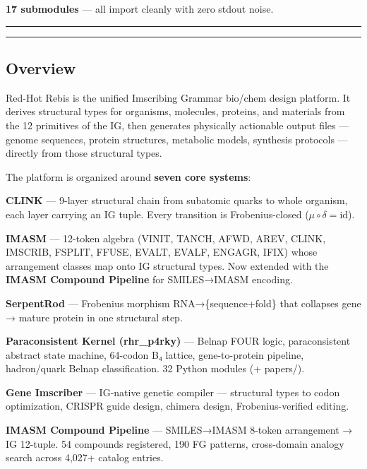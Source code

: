 \documentclass[12pt,a4paper]{article}
\begin{document}
\textbf{17 submodules} --- all import cleanly with zero stdout noise.

\begin{center}\rule{0.5\linewidth}{0.5pt}\end{center}

\begin{center}\rule{0.5\linewidth}{0.5pt}\end{center}

\hypertarget{overview}{%
\subsection{Overview}\label{overview}}

Red-Hot Rebis is the unified Imscribing Grammar bio/chem design
platform. It derives structural types for organisms, molecules,
proteins, and materials from the 12 primitives of the IG, then generates
physically actionable output files --- genome sequences, protein
structures, metabolic models, synthesis protocols --- directly from
those structural types.

The platform is organized around \textbf{seven core systems}:

\textbf{CLINK} --- 9-layer structural chain from subatomic quarks to
whole organism, each layer carrying an IG tuple. Every transition is
Frobenius-closed (\(\mu\circ\delta=\text{id}\)).

\textbf{IMASM} --- 12-token algebra (VINIT, TANCH, AFWD, AREV, CLINK,
IMSCRIB, FSPLIT, FFUSE, EVALT, EVALF, ENGAGR, IFIX) whose arrangement
classes map onto IG structural types. Now extended with the
\textbf{IMASM Compound Pipeline} for SMILES→IMASM encoding.

\textbf{SerpentRod} --- Frobenius morphism RNA→\{sequence+fold\} that
collapses gene → mature protein in one structural step.

\textbf{Paraconsistent Kernel (rhr\_p4rky)} --- Belnap FOUR logic,
paraconsistent abstract state machine, 64-codon B₄ lattice,
gene-to-protein pipeline, hadron/quark Belnap classification. 32 Python
modules (+ papers/).

\textbf{Gene Imscriber} --- IG-native genetic compiler --- structural
types to codon optimization, CRISPR guide design, chimera design,
Frobenius-verified editing.

\textbf{IMASM Compound Pipeline} --- SMILES→IMASM 8-token arrangement →
IG 12-tuple. 54 compounds registered, 190 FG patterns, cross-domain
analogy search across 4,027+ catalog entries.
\end{document}
